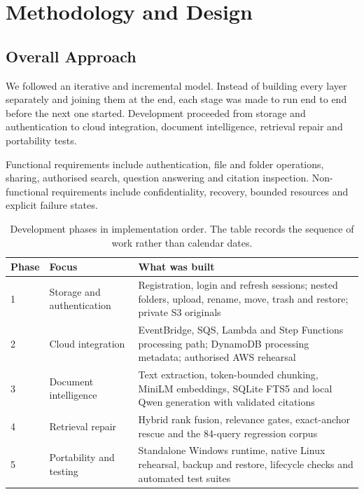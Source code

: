 \chapter{Methodology and Design}
\label{ch:design}

\section{Overall Approach}

We followed an iterative and incremental model. Instead of building every layer separately and joining them at the end, each stage was made to run end to end before the next one started. Development proceeded from storage and authentication to cloud integration, document intelligence, retrieval repair and portability tests.

Functional requirements include authentication, file and folder operations, sharing, authorised search, question answering and citation inspection. Non-functional requirements include confidentiality, recovery, bounded resources and explicit failure states.

\begin{table}[htbp]
\centering
\begin{tabularx}{\textwidth}{@{}p{1.2cm}>{\raggedright\arraybackslash}p{3.4cm}L@{}}
\toprule
\textbf{Phase} & \textbf{Focus} & \textbf{What was built}\\
 & Storage and authentication & Registration, login and refresh sessions; nested folders, upload, rename, move, trash and restore; private S3 originals\\
2 & Cloud integration & EventBridge, SQS, Lambda and Step Functions processing path; DynamoDB processing metadata; authorised AWS rehearsal\\
3 & Document intelligence & Text extraction, token-bounded chunking, MiniLM embeddings, SQLite FTS5 and local Qwen generation with validated citations\\
4 & Retrieval repair & Hybrid rank fusion, relevance gates, exact-anchor rescue and the 84-query regression corpus\\
5 & Portability and testing & Standalone Windows runtime, native Linux rehearsal, backup and restore, lifecycle checks and automated test suites\\
\bottomrule
\end{tabularx}
\caption{Development phases in implementation order. The table records the sequence of work rather than calendar dates.}
\label{tab:phases}
\end{table}

